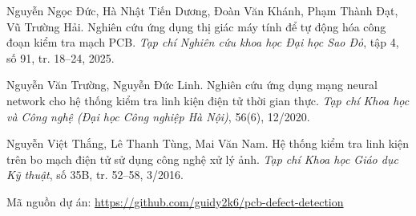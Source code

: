 \documentclass[11pt,a4paper]{article}
\begin{document}
\begin{enumerate}[label={[\arabic*]},leftmargin=2.4em,itemsep=4pt]
  \item\label{ref:duc} Nguyễn Ngọc Đức, Hà Nhật Tiến Dương, Đoàn Văn Khánh, Phạm Thành Đạt, Vũ Trường Hải. Nghiên cứu ứng dụng thị giác máy tính để tự động hóa công đoạn kiểm tra mạch PCB. \emph{Tạp chí Nghiên cứu khoa học Đại học Sao Đỏ}, tập 4, số 91, tr. 18--24, 2025.
  \item\label{ref:truong} Nguyễn Văn Trường, Nguyễn Đức Linh. Nghiên cứu ứng dụng mạng neural network cho hệ thống kiểm tra linh kiện điện tử thời gian thực. \emph{Tạp chí Khoa học và Công nghệ (Đại học Công nghiệp Hà Nội)}, 56(6), 12/2020.
  \item\label{ref:thang} Nguyễn Việt Thắng, Lê Thanh Tùng, Mai Văn Nam. Hệ thống kiểm tra linh kiện trên bo mạch điện tử sử dụng công nghệ xử lý ảnh. \emph{Tạp chí Khoa học Giáo dục Kỹ thuật}, số 35B, tr. 52--58, 3/2016.
  \item\label{ref:repo} Mã nguồn dự án: \url{https://github.com/guidy2k6/pcb-defect-detection}
\end{enumerate}
\end{document}
